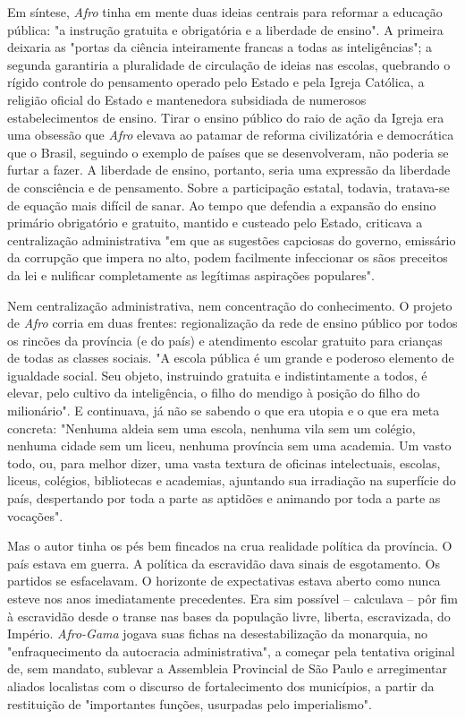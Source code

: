 Em síntese, \emph{Afro} tinha em mente duas ideias centrais para
reformar a educação pública: "a instrução gratuita e obrigatória e a
liberdade de ensino". A primeira deixaria as "portas da ciência
inteiramente francas a todas as inteligências"; a segunda garantiria a
pluralidade de circulação de ideias nas escolas, quebrando o rígido
controle do pensamento operado pelo Estado e pela Igreja Católica, a
religião oficial do Estado e mantenedora subsidiada de numerosos
estabelecimentos de ensino. Tirar o ensino público do raio de ação da
Igreja era uma obsessão que \emph{Afro} elevava ao patamar de reforma
civilizatória e democrática que o Brasil, seguindo o exemplo de países
que se desenvolveram, não poderia se furtar a fazer. A liberdade de
ensino, portanto, seria uma expressão da liberdade de consciência e de
pensamento. Sobre a participação estatal, todavia, tratava-se de equação
mais difícil de sanar. Ao tempo que defendia a expansão do ensino
primário obrigatório e gratuito, mantido e custeado pelo Estado,
criticava a centralização administrativa "em que as sugestões capciosas
do governo, emissário da corrupção que impera no alto, podem facilmente
infeccionar os sãos preceitos da lei e nulificar completamente as
legítimas aspirações populares".

Nem centralização administrativa, nem concentração do conhecimento. O
projeto de \emph{Afro} corria em duas frentes: regionalização da rede de
ensino público por todos os rincões da província (e do país) e
atendimento escolar gratuito para crianças de todas as classes sociais.
"A escola pública é um grande e poderoso elemento de igualdade social.
Seu objeto, instruindo gratuita e indistintamente a todos, é elevar,
pelo cultivo da inteligência, o filho do mendigo à posição do filho do
milionário". E continuava, já não se sabendo o que era utopia e o que
era meta concreta: "Nenhuma aldeia sem uma escola, nenhuma vila sem um
colégio, nenhuma cidade sem um liceu, nenhuma província sem uma
academia. Um vasto todo, ou, para melhor dizer, uma vasta textura de
oficinas intelectuais, escolas, liceus, colégios, bibliotecas e
academias, ajuntando sua irradiação na superfície do país, despertando
por toda a parte as aptidões e animando por toda a parte as vocações".

Mas o autor tinha os pés bem fincados na crua realidade política da
província. O país estava em guerra. A política da escravidão dava sinais
de esgotamento. Os partidos se esfacelavam. O horizonte de expectativas
estava aberto como nunca esteve nos anos imediatamente precedentes. Era
sim possível -- calculava -- pôr fim à escravidão desde o transe nas
bases da população livre, liberta, escravizada, do Império.
\emph{Afro-Gama} jogava suas fichas na desestabilização da monarquia, no
"enfraquecimento da autocracia administrativa", a começar pela tentativa
original de, sem mandato, sublevar a Assembleia Provincial de São Paulo
e arregimentar aliados localistas com o discurso de fortalecimento dos
municípios, a partir da restituição de "importantes funções, usurpadas
pelo imperialismo".

